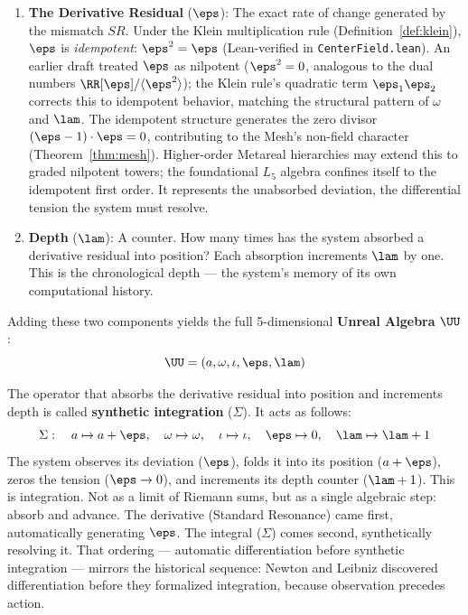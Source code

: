 \begin{enumerate}
\item \textbf{The Derivative Residual} ($\eps$): The exact rate of change generated by the mismatch $SR$. Under the Klein multiplication rule (Definition~\ref{def:klein}), $\eps$ is \emph{idempotent}: $\eps^2 = \eps$ (Lean-verified in \texttt{CenterField.lean}). An earlier draft treated $\eps$ as nilpotent ($\eps^2 = 0$, analogous to the dual numbers $\RR[\eps]/\langle\eps^2\rangle$); the Klein rule's quadratic term $\eps_1 \eps_2$ corrects this to idempotent behavior, matching the structural pattern of $\omega$ and $\lam$. The idempotent structure generates the zero divisor $(\eps - 1)\cdot \eps = 0$, contributing to the Mesh's non-field character (Theorem~\ref{thm:mesh}). Higher-order Metareal hierarchies may extend this to graded nilpotent towers; the foundational $L_5$ algebra confines itself to the idempotent first order. It represents the unabsorbed deviation, the differential tension the system must resolve.
\item \textbf{Depth} ($\lam$): A counter. How many times has the system absorbed a derivative residual into position? Each absorption increments $\lam$ by one. This is the chronological depth --- the system's memory of its own computational history.
\end{enumerate}

Adding these two components yields the full 5-dimensional \textbf{Unreal Algebra} $\UU$:
$$\UU = (a, \omega, \iota, \eps, \lam)$$

The operator that absorbs the derivative residual into position and increments depth is called \textbf{synthetic integration} ($\Sigma$). It acts as follows:
$$\Sigma: \quad a \mapsto a + \eps, \quad \omega \mapsto \omega, \quad \iota \mapsto \iota, \quad \eps \mapsto 0, \quad \lam \mapsto \lam + 1$$
The system observes its deviation ($\eps$), folds it into its position ($a + \eps$), zeros the tension ($\eps \to 0$), and increments its depth counter ($\lam + 1$). This is integration. Not as a limit of Riemann sums, but as a single algebraic step: absorb and advance. The derivative (Standard Resonance) came first, automatically generating $\eps$. The integral ($\Sigma$) comes second, synthetically resolving it. That ordering --- automatic differentiation before synthetic integration --- mirrors the historical sequence: Newton and Leibniz discovered differentiation before they formalized integration, because observation precedes action.

